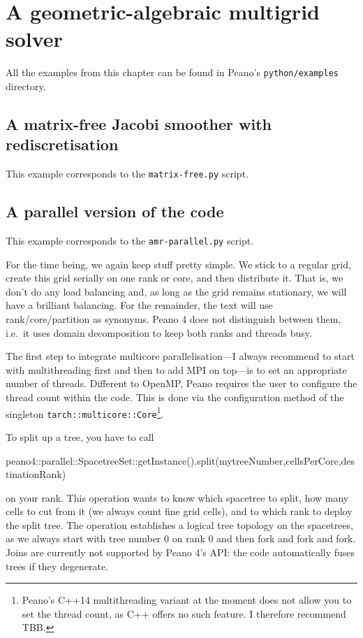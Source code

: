 \chapter{A geometric-algebraic multigrid solver}
\label{section:python-api-examples:multigrid}

All the examples from this chapter can be found in Peano's
\texttt{python/examples} directory.


\section{A matrix-free Jacobi smoother with rediscretisation}

\begin{remark}
 This example corresponds to the \texttt{matrix-free.py} script.
\end{remark}



\section{A parallel version of the code}

\begin{remark}
 This example corresponds to the \texttt{amr-parallel.py} script.
\end{remark}

For the time being, we again keep stuff pretty simple.
We stick to a regular grid, create this grid serially on one rank or core, 
and then distribute it.
That is, we don't do any load balancing and, as long as the grid remains 
stationary, we will have a brilliant balancing.
For the remainder, the text will use rank/core/partition as synonyms.
Peano 4 does not distinguish between them, i.e.~it uses domain decomposition
to keep both ranks and threads busy.


The first step to integrate multicore parallelisation---I always recommend to
start with multithreading first and then to add MPI on top---is to set an
appropriate number of threads.
Different to OpenMP, Peano requires the user to configure the thread count
within the code. 
This is done via the configuration method of the singleton
\texttt{tarch::multicore::Core}\footnote{Peano's C++14 multithreading variant
at the moment does not allow you to set the thread count, as C++ offers no such
feature. I therefore recommend TBB.}.


To split up a tree, you have to call
\begin{code}
  peano4::parallel::SpacetreeSet::getInstance().split(mytreeNumber,cellsPerCore,destinationRank)
\end{code}
\noindent
on your rank. This operation wants to know which spacetree to split, how many
cells to cut from it (we always count fine grid cells), and to which rank to
deploy the split tree.
The operation establishes a logical tree topology on the spacetrees, as we
always start with tree number 0 on rank 0 and then fork and fork and fork.
Joins are currently not supported by Peano 4's API: the code automatically fuses
trees if they degenerate.


